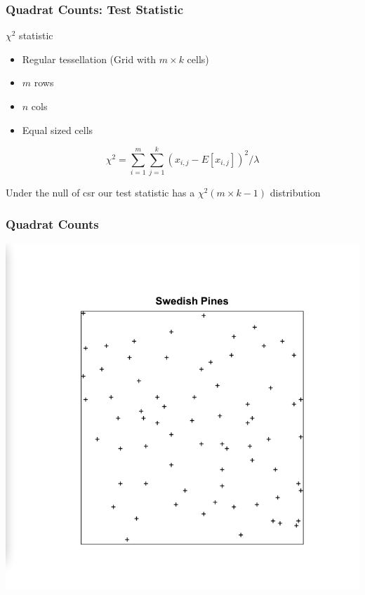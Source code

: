 \documentclass[nototal,handout]{beamer}
\begin{document}
\begin{frame}[<+->]
  \frametitle{Quadrat Counts: Test Statistic}
  \begin{block}{$\chi^2$ statistic}
    \begin{itemize}
      \item Regular tessellation (Grid with $m \times k$ cells)
      \item $m$ rows
      \item $n$ cols
      \item Equal sized cells
    \end{itemize}
    \begin{equation}
      \chi^2 = \sum_{i=1}^m \sum_{j=1}^k (x_{i,j}- E[x_{i,j}])^2/\lambda
      \label{}
    \end{equation}

    Under the null of csr our test statistic has a $\chi^2 (m\times k -1)$
    distribution
   \end{block}
 \end{frame}



\begin{frame}[<+->] 
    \frametitle{Quadrat Counts}
    \begin{center}
      \includegraphics[width=.65\linewidth]{swedish_pines.png}
    \end{center}
  \end{frame}
\end{document}
